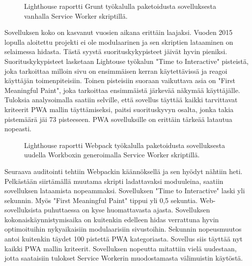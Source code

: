 \documentclass{tktltiki}
\begin{document}
\begin{figure}[h]
\begin{center}
\caption{Lighthouse raportti Grunt työkalulla paketoidusta sovelluksesta vanhalla Service Worker skriptillä.}
\label{Lighthouse raportti 1}
\end{center}
\end{figure}

\clearpage

Sovelluksen koko on kasvanut vuosien aikana erittäin laajaksi. Vuoden 2015 lopulla aloitettu projekti ei ole modulaarinen ja sen skriptien lataaminen on selaimessa hidasta. Tästä syystä suorituskykypisteet jäivät hyvin pieniksi. Suorituskykypisteet lasketaan Lightouse työkalun "Time to Interactive" pisteistä, joka tarkoittaa milloin sivu on ensimmäisen kerran käytettävissä ja reagoi käyttäjän toimenpiteisiin. Toinen pisteisiin suoraan vaikuttava asia on "First Meaningful Paint", joka tarkoittaa ensimmäistä järkevää näkymää käyttäjälle. Tuloksia analysoimalla saatiin selville, että sovellus täyttää kaikki tarvittavat kriteerit PWA mallin täyttämiseksi, paitsi suorituskyvyn osalta, jonka takia pistemäärä jäi 73 pisteeseen. PWA sovelluksille on erittäin tärkeää latautua nopeasti. 


\begin{figure}[!h]
\begin{center}
\caption{Lighthouse raportti Webpack työkalulla paketoidusta sovelluksesta uudella Workboxin generoimalla Service Worker skriptillä.}
\label{Lighthouse raportti 2}
\end{center}
\end{figure}

\clearpage

Seuraava auditointi tehtiin Webpackin käännöksellä ja sen hyödyt nähtiin heti. Pelkästään siirtämällä muutama skripti ladattavaksi moduuleina, saatiin sovelluksen lataamista nopeammaksi. Sovelluksen "Time to Interactive" laski yli sekunnin. Myös "First Meaningful Paint" tippui yli 0,5 sekuntia. Web-sovelluksista puhuttaessa on kyse huomattavasta ajasta. Sovelluksen kokonaiskäynnistymisaika on kuitenkin edelleen hidas verrattuna hyvin optimoituihin nykyaikaisiin modulaarisiin sivustoihin. Sekunnin nopeusmuutos antoi kuitenkin täydet 100 pistettä PWA kategoriasta. Sovellus siis täyttää nyt kaikki PWA mallin kriteerit. Sovelluksen nopeutta mitattiin vielä uudestaan, jotta saataisiin tulokset Service Workerin muodostamasta välimuistin käytöstä.
\end{document}
